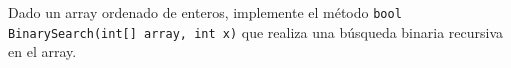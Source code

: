 Dado un array ordenado de enteros, implemente el método
\texttt{bool BinarySearch(int[] array, int x)}
que realiza una búsqueda binaria recursiva en el array.
